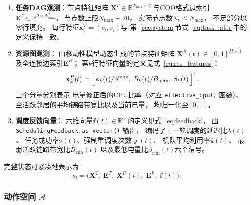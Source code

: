 \begin{enumerate}[label=(\roman*), leftmargin=*, itemsep=3pt]

  \item \textbf{任务DAG观测}：节点特征矩阵
        $\mathbf{X}^T \in \mathbb{R}^{N_{\max} \times 2}$
        与COO格式边索引
        $\mathbf{E}^T \in \mathbb{Z}^{2 \times N_{\max}^2}$，
        节点数上限$N_{\max} = 20$，
        实际节点数$N_t \leq N_{\max}$，
        不足部分以零行填充。
        每行特征$\mathbf{x}_i^T = (c_i, s_i)$与
        第~\ref{sec:system}节式~\eqref{eq:task_attr}中的定义保持一致。

  \item \textbf{资源图观测}：
        由移动性模型动态生成的节点特征矩阵
        $\mathbf{X}^R(t) \in [0,1]^{M \times 3}$
        及全连接边索引$\mathbf{E}^R$；
        第$k$行特征向量的定义见式~\eqref{eq:res_features}：
        \begin{equation}
          \mathbf{x}_k^R(t) =
          \Bigl[\,
            \tilde{\phi}_k(t)/\phi^{\max},\;
            \bar{B}_k(t)/B_{\max},\;
            \beta_k(t)
          \,\Bigr]^\top.
          \label{eq:res_feat_method}
        \end{equation}
        三个分量分别表示
        电量修正后的CPU比率（对应 \texttt{effective\_cpu()} 函数）、
        至活跃邻居的平均链路带宽比以及当前电量，
        均归一化至$[0,1]$。

  \item \textbf{调度反馈向量}：
        六维向量$\mathbf{f}(t) \in \mathbb{R}^6$
        的定义见式~\eqref{eq:feedback}，
        由 \texttt{SchedulingFeedback.as\_vector()} 输出，
        编码了上一轮调度的延迟比$\lambda(t)$、
        任务成功率$\sigma(t)$、强制重调度次数$\varrho(t)$、
        机队平均利用率$\bar{u}(t)$、
        最弱活跃链路带宽比$\hat{B}_{\min}(t)$
        以及最低电量比$\hat{\beta}_{\min}(t)$六个信号。
\end{enumerate}

完整状态可紧凑地表示为
\begin{equation}
  s_t = \bigl(
    \mathbf{X}^T,\;\mathbf{E}^T,\;
    \mathbf{X}^R(t),\;\mathbf{E}^R,\;
    \mathbf{f}(t)
  \bigr).
  \label{eq:state}
\end{equation}

\subsubsection*{动作空间 $\mathcal{A}$}

